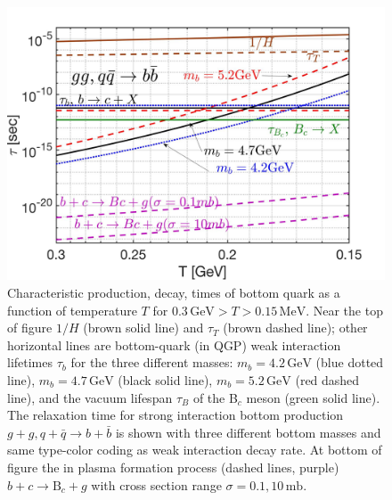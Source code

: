 \begin{figure} 
\centerline{\includegraphics[width=0.9\linewidth]{./plots/BQuarkReactionTime003}}
\caption{Characteristic production, decay, times of bottom quark  as a function of  temperature $T$ for $0.3\,\mathrm{GeV}>T> 0.15\,\mathrm{MeV}$.  Near the top of figure  $1/H$ (brown solid line) and $\tau_T$ (brown dashed line); other horizontal lines are bottom-quark (in QGP) weak interaction lifetimes $\tau_b$ for the three different masses: $m_b=4.2\,\mathrm{GeV}$ (blue dotted line), $m_b=4.7\,\mathrm{GeV}$ (black solid  line), $m_b=5.2\,\mathrm{GeV}$ (red dashed line), and the vacuum lifespan $\tau_B$ of the  B$_c$ meson (green solid  line). The relaxation time for strong interaction bottom production $g+g, q+\bar q\rightarrow b+\bar{b}$ is shown with three different bottom masses and same type-color coding as weak interaction decay rate. At bottom of figure the in plasma formation process (dashed lines, purple) $b+c\rightarrow \mathrm{B}_c+g$ with cross section range $\sigma=0.1,10\,\mathrm{mb}$. }
\label{ReactionTime}
\end{figure}


